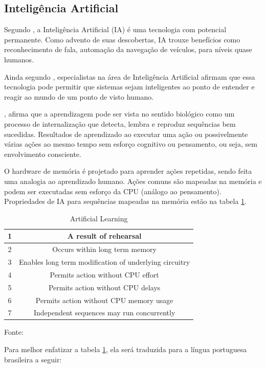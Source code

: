 \subsection{Inteligência Artificial}

Segundo \cite{anthes}, a Inteligência Artificial (IA) é uma tecnologia com potencial permanente. Como advento de suas descobertas, IA trouxe benefícios como reconhecimento de fala, automação da navegação de veículos, para níveis quase humanos.

Ainda segundo \cite{anthes}, especialistas na área de Inteligência Artificial afirmam que essa tecnologia pode permitir que sistemas sejam inteligentes ao ponto de entender e reagir ao mundo de um ponto de visto humano. 

\cite{john}, afirma que a aprendizagem pode ser vista no sentido biológico como um processo de internalização que detecta, lembra e reproduz sequências bem sucedidas. Resultados de aprendizado ao executar uma ação ou possivelmente várias ações ao mesmo tempo sem esforço cognitivo ou pensamento, ou seja, sem envolvimento consciente.

O hardware de memória é projetado para aprender ações repetidas, sendo feita uma analogia ao aprendizado humano. Ações comuns são mapeadas na memória e podem ser executadas sem esforço da CPU (análogo ao pensamento). Propriedades de IA para sequências mapeadas na memória estão na tabela \ref{tab:artificial}.

\begin{table}[H]
\centering
\begin{tabular}{|c|c|}
\hline
1 & A result of rehearsal                    \\ \hline
2 & Occurs within long term memory \\ \hline
3 & Enables long term modification of underlying circuitry \\ \hline
4 & Permits action without CPU effort \\ \hline
5 & Permits action without CPU delays \\ \hline
6 & Permits action without CPU memory usage \\ \hline
7 & Independent sequences may run concurrently \\ \hline
\end{tabular}
\caption{Artificial Learning}
Fonte: \cite{john}
\label{tab:artificial}
\end{table}

Para melhor enfatizar a tabela \ref{tab:artificial}, ela será traduzida para a língua portuguesa brasileira a seguir:


